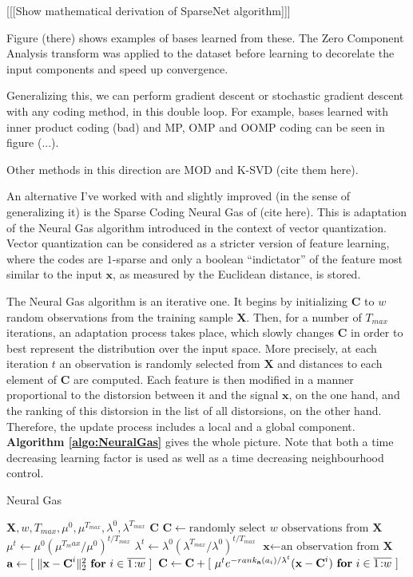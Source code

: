 \documentclass[12pt,a4paper,oneside,english]{UPBThesis}
\newcommand{\hcrange}[2]{\overline{{#1}\colon\!\!{#2}}}
\begin{document}
[[[Show mathematical derivation of SparseNet algorithm]]]

Figure (there) shows examples of bases learned from these. The Zero Component Analysis transform was applied to the dataset before learning to decorelate the input components and speed up convergence.

Generalizing this, we can perform gradient descent or stochastic gradient descent with any coding method, in this double loop. For example, bases learned with inner product coding (bad) and MP, OMP and OOMP coding can be seen in figure (...).

Other methods in this direction are MOD and K-SVD (cite them here).

An alternative I've worked with and slightly improved (in the sense of generalizing it) is the Sparse Coding Neural Gas of (cite here). This is adaptation of the Neural Gas algorithm introduced in the context of vector quantization. Vector quantization can be considered as a stricter version of feature learning, where the codes are $1$-sparse and only a boolean ``indictator'' of the feature most similar to the input $\textbf{x}$, as measured by the Euclidean distance, is stored.

The Neural Gas algorithm is an iterative one. It begins by initializing $\textbf{C}$ to $w$ random observations from the training sample $\textbf{X}$. Then, for a number of $T_{max}$ iterations, an adaptation process takes place, which slowly changes $\textbf{C}$ in order to best represent the distribution over the input space. More precisely, at each iteration $t$ an observation is randomly selected from $\textbf{X}$ and distances to each element of $\textbf{C}$ are computed. Each feature is then modified in a manner proportional to the distorsion between it and the signal $\textbf{x}$, on the one hand, and the ranking of this distorsion in the list of all distorsions, on the other hand. Therefore, the update process includes a local and a global component. \textbf{Algorithm \ref{algo:NeuralGas}} gives the whole picture. Note that both a time decreasing learning factor is used as well as a time decreasing neighbourhood control. 

\begin{algorithm}
\caption{Neural Gas}
\label{algo:NeuralGas}
\begin{algorithmic}
\Require $\textbf{X},w,T_{max},\mu^0,\mu^{T_{max}},\lambda^0,\lambda^{T_{max}}$
\Ensure $\textbf{C}$
\State $\textbf{C} \gets \mbox{randomly select $w$ observations from $\textbf{X}$}$
\For {$t = \hcrange{1}{T_{max}}$}
\State $\mu^t \gets \mu^0 (\mu^{T_max} / \mu^0)^{t / T_{max}}$ 
\State $\lambda^t \gets \lambda^0 (\lambda^{T_{max}} / \lambda^0)^{t / T_{max}}$ 
\State $\textbf{x} \gets \text{an observation from $\textbf{X}$}$
\State $\textbf{a} \gets [ ~ \|\textbf{x} - \textbf{C}^i\|_2^2 ~ \mbox{\textbf{for} $i \in \hcrange{1}{w}$} ~ ]$
\State $\textbf{C} \gets \textbf{C} + [ ~ \mu^t e^{-rank_{\textbf{a}}(a_i) / \lambda^t} (\textbf{x} - \textbf{C}^i) ~ \mbox{\textbf{for} $i \in \hcrange{1}{w}$} ~ ]$
\EndFor
\end{algorithmic}
\end{algorithm}
\end{document}
